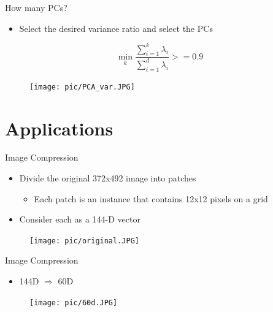 \documentclass[serif, aspectratio=169]{beamer}
\begin{document}
\begin{frame}{How many PCs?}
    \begin{minipage}{0.4\textwidth}
         \begin{itemize}
            \item Select the desired variance ratio and select the PCs 
        \end{itemize}
         $$\min_k \frac{\sum_{i=1}^{k} \lambda_i}{\sum_{i=1}^{d} \lambda_i} >= 0.9$$
    \end{minipage}
    \begin{minipage}{0.55\textwidth}
        \begin{figure}[htpb]
            \begin{center}
                \texttt{[image: pic/PCA\_var.JPG]}
            \end{center}
        \end{figure}
    \end{minipage}
\end{frame}

\section{Applications}

\begin{frame}{Image Compression}
       \begin{itemize}
           \item Divide the original 372x492 image into patches
\begin{itemize}
    \item Each patch is an instance that contains 12x12 pixels on a grid
\end{itemize}
            \item Consider each as a 144-D vector
       \end{itemize}
        \begin{figure}[htpb]
            \begin{center}
                \texttt{[image: pic/original.JPG]}
            \end{center}
        \end{figure}
\end{frame}

\begin{frame}{Image Compression}
       \begin{itemize}
           \item 144D $\Rightarrow$ 60D
       \end{itemize}
        \begin{figure}[htpb]
            \begin{center}
                \texttt{[image: pic/60d.JPG]}
            \end{center}
        \end{figure}
\end{frame}
\end{document}
